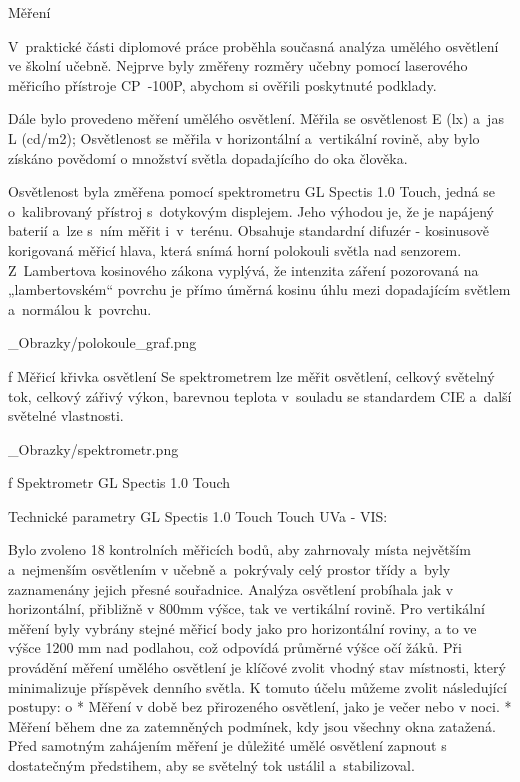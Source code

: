 \chap Měření

V~praktické části diplomové práce proběhla současná analýza umělého osvětlení ve školní učebně.
Nejprve byly změřeny rozměry učebny pomocí laserového měřicího přístroje {\sbf CP~-100P},
abychom si ověřili poskytnuté podklady.

Dále bylo provedeno měření umělého osvětlení. Měřila se osvětlenost E (lx) a~jas L (cd/m2);
Osvětlenost se měřila v horizontální a~vertikální rovině, aby bylo získáno povědomí o množství světla dopadajícího do oka člověka.

Osvětlenost byla změřena pomocí spektrometru {\sbf GL Spectis 1.0 Touch}, jedná se o~kalibrovaný přístroj
s~dotykovým displejem. Jeho výhodou je, že je napájený baterií a~lze s~ním měřit i~v~terénu. Obsahuje standardní
difuzér - kosinusově korigovaná měřicí hlava, která snímá horní polokouli světla nad senzorem. Z~Lambertova
kosinového zákona vyplývá, že intenzita záření pozorovaná na „lambertovském“ povrchu je přímo úměrná kosinu
úhlu mezi dopadajícím světlem a~normálou k~povrchu.

\medskip {}
\picw=8cm _Obrazky/polokoule_graf.png
\caption/f Měřicí křivka osvětlení
\medskip
Se spektrometrem lze měřit osvětlení, celkový světelný tok, celkový zářivý výkon, barevnou teplota v~souladu
se standardem CIE a~další světelné vlastnosti.

\medskip {}
\picw=5cm _Obrazky/spektrometr.png
\caption/f Spektrometr GL Spectis 1.0 Touch
\medskip

\medskip
{\sbf Technické parametry GL Spectis 1.0 Touch Touch UVa - VIS:}
\medskip
{}

Bylo zvoleno 18 kontrolních měřicích bodů, aby zahrnovaly místa  největším a~nejmenším osvětlením v učebně a~pokrývaly celý prostor třídy
a~byly zaznamenány jejich přesné souřadnice. Analýza osvětlení probíhala jak v horizontální,
přibližně v 800mm výšce, tak ve vertikální rovině. Pro vertikální měření byly vybrány stejné měřicí body jako pro horizontální roviny,
a to ve výšce 1200 mm nad podlahou, což odpovídá průměrné výšce očí žáků.
\medskip
Při provádění měření umělého osvětlení je klíčové zvolit vhodný stav místnosti,
který minimalizuje příspěvek denního světla. K tomuto účelu můžeme zvolit následující postupy:
\medskip
\begitems \style o
    * Měření v době bez přirozeného osvětlení, jako je večer nebo v noci.
    * Měření během dne za zatemněných podmínek, kdy jsou všechny okna zatažená.
\enditems
\medskip
Před samotným zahájením měření je důležité umělé osvětlení zapnout s dostatečným předstihem, aby se světelný tok ustálil a~stabilizoval.

